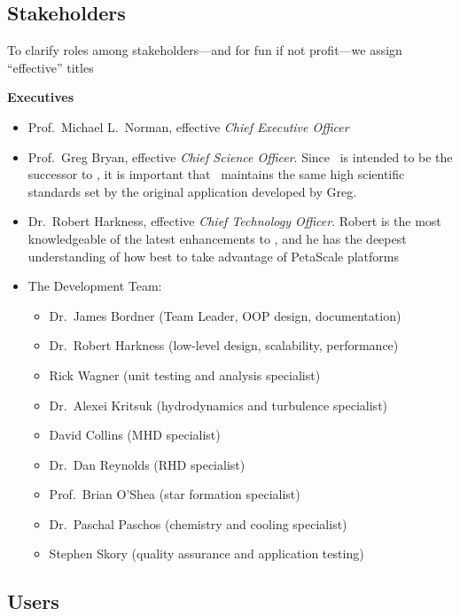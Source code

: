 \documentclass[11pt]{article}
\begin{document}
\subsection{Stakeholders}


    To clarify roles among stakeholders---and for fun if not
    profit---we assign ``effective'' titles

\textbf{Executives}
\begin{itemize}
%
    \item  Prof.~Michael L.~Norman, effective \textit{Chief Executive Officer}
%
    \item Prof.~Greg Bryan, effective \textit{Chief Science Officer}.
    Since \cello\ is intended to be the successor to \enzo, it is
    important that \cello\ maintains the same high scientific
    standards set by the original application developed by Greg.
%
    \item Dr.~Robert Harkness, effective \textit{Chief Technology
    Officer}.  Robert is the most knowledgeable of the latest
    enhancements to \enzo, and he has the deepest understanding of how
    best to take advantage of PetaScale platforms
%
    \item The Development Team:
    \begin{itemize}
    \item Dr.~James Bordner (Team Leader, OOP design, documentation)
    \item Dr.~Robert Harkness (low-level design, scalability, performance)
    \item Rick Wagner (unit testing and analysis specialist)
    \item Dr.~Alexei Kritsuk (hydrodynamics and turbulence specialist)
    \item David Collins (MHD specialist)
    \item Dr.~Dan Reynolds (RHD specialist)
    \item Prof.~Brian O'Shea (star formation specialist)
    \item Dr.~Paschal Paschos (chemistry and cooling specialist)
    \item Stephen Skory (quality assurance and application testing)
    \end{itemize}
    \end{itemize}

\subsection{Users}
\end{document}
